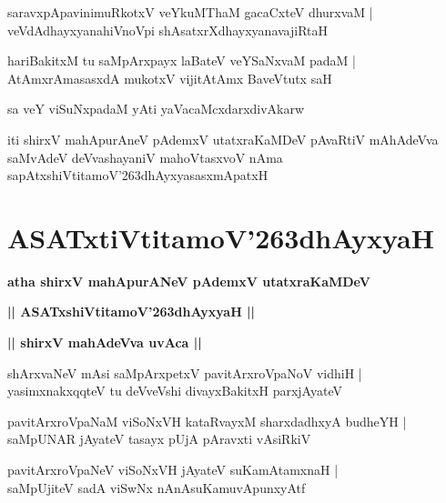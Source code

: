 \documentclass[twoside,12pt,openright]{book}
\def\S{\char'263}
\newcounter{shloka}[chapter]
\def\uvaca#1{\centerline{{\large\textbf{#1}}}}
\begin{document}
\begin{shloka}%
saravxpApavinimuRkotxV veYkuMThaM gacaCxteV dhurxvaM |\\
veVdAdhayxyanahiVnoVpi shAsatxrXdhayxyanavajiRtaH 
\end{shloka}

\begin{shloka}%
hariBakitxM tu saMpArxpayx laBateV veYSaNxvaM padaM |\\
AtAmxrAmasasxdA mukotxV vijitAtAmx BaveVtutx saH 
\end{shloka}

\begin{shloka}%
sa veY viSuNxpadaM yAti yaVacaMcxdarxdivAkarw
\end{shloka}

\begin{center}
iti shirxV mahApurAneV pAdemxV utatxraKaMDeV pAvaRtiV mAhAdeVva saMvAdeV deVvashayaniV mahoVtasxvoV 
nAma sapAtxshiVtitamoV\S dhAyxyasasxmApatxH 
\end{center}

\chapter{ASATxtiVtitamoV\S dhAyxyaH}

\begin{center}
{\LARGE\bfseries atha shirxV mahApurANeV pAdemxV utatxraKaMDeV}
\end{center}

\begin{center}
{\LARGE\bfseries || ASATxshiVtitamoV\S dhAyxyaH || }
\end{center}

\uvaca{|| shirxV mahAdeVva uvAca ||}

\begin{shloka}%
shArxvaNeV mAsi saMpArxpetxV pavitArxroVpaNoV vidhiH |\\
yasimxnakxqqteV tu deVveVshi divayxBakitxH parxjAyateV 
\end{shloka}

\begin{shloka}%
pavitArxroVpaNaM viSoNxVH kataRvayxM sharxdadhxyA budheYH |\\
saMpUNAR jAyateV tasayx pUjA pAravxti vAsiRkiV
\end{shloka}

\begin{shloka}%
pavitArxroVpaNeV viSoNxVH jAyateV suKamAtamxnaH |\\
saMpUjiteV sadA viSwNx nAnAsuKamuvApunxyAtf
\end{shloka}
\end{document}
